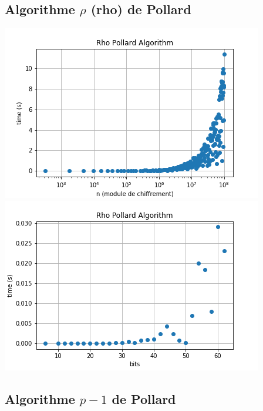 \documentclass[a4paper, 12pt]{article}
\begin{document}
\subsection{Algorithme $\rho$ (rho) de Pollard}

\begin{center}
    \includegraphics[width=0.7\linewidth]{images/rho_big.png}
    \includegraphics[width=0.7\linewidth]{images/rho_small.png}
\end{center}

\subsection{Algorithme $p - 1$ de Pollard}
\end{document}
